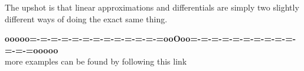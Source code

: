 \documentclass{ximera}
\begin{document}
The upshot is that linear approximations and differentials are simply
two slightly different ways of doing the exact same thing.








\begin{center}
\textbf{\textcolor{green!50!black}{ooooo=-=-=-=-=-=-=-=-=-=-=-=-=ooOoo=-=-=-=-=-=-=-=-=-=-=-=-=ooooo}} \\

more examples can be found by following this link\\ 

\end{center}
\end{document}
